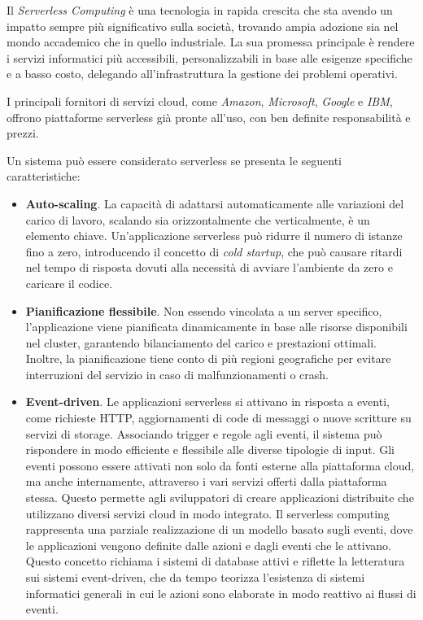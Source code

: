 Il \textit{Serverless Computing} è una tecnologia in rapida crescita che sta avendo un impatto sempre più significativo sulla società, trovando ampia adozione sia nel mondo accademico che in quello industriale. La sua promessa principale è rendere i servizi informatici più accessibili, personalizzabili in base alle esigenze specifiche e a basso costo, delegando all'infrastruttura la gestione dei problemi operativi.

I principali fornitori di servizi cloud, come \textit{Amazon}, \textit{Microsoft}, \textit{Google} e \textit{IBM}, offrono piattaforme serverless già pronte all'uso, con ben definite responsabilità e prezzi.

Un sistema può essere considerato serverless se presenta le seguenti caratteristiche:
\begin{itemize}
    \item \textbf{Auto-scaling}. La capacità di adattarsi automaticamente alle variazioni del carico di lavoro, scalando sia orizzontalmente che verticalmente, è un elemento chiave. Un'applicazione serverless può ridurre il numero di istanze fino a zero, introducendo il concetto di \textit{cold startup}, che può causare ritardi nel tempo di risposta dovuti alla necessità di avviare l'ambiente da zero e caricare il codice.
    \item \textbf{Pianificazione flessibile}. Non essendo vincolata a un server specifico, l'applicazione viene pianificata dinamicamente in base alle risorse disponibili nel cluster, garantendo bilanciamento del carico e prestazioni ottimali. Inoltre, la pianificazione tiene conto di più regioni geografiche per evitare interruzioni del servizio in caso di malfunzionamenti o crash.
    \item \textbf{Event-driven}. Le applicazioni serverless si attivano in risposta a eventi, come richieste HTTP, aggiornamenti di code di messaggi o nuove scritture su servizi di storage. Associando trigger e regole agli eventi, il sistema può rispondere in modo efficiente e flessibile alle diverse tipologie di input. Gli eventi possono essere attivati non solo da fonti esterne alla piattaforma cloud, ma anche internamente, attraverso i vari servizi offerti dalla piattaforma stessa. Questo permette agli sviluppatori di creare applicazioni distribuite che utilizzano diversi servizi cloud in modo integrato. Il serverless computing rappresenta una parziale realizzazione di un modello basato sugli eventi, dove le applicazioni vengono definite dalle azioni e dagli eventi che le attivano. Questo concetto richiama i sistemi di database attivi e riflette la letteratura sui sistemi event-driven, che da tempo teorizza l'esistenza di sistemi informatici generali in cui le azioni sono elaborate in modo reattivo ai flussi di eventi.\cite{7979855}
    

\end{itemize}
